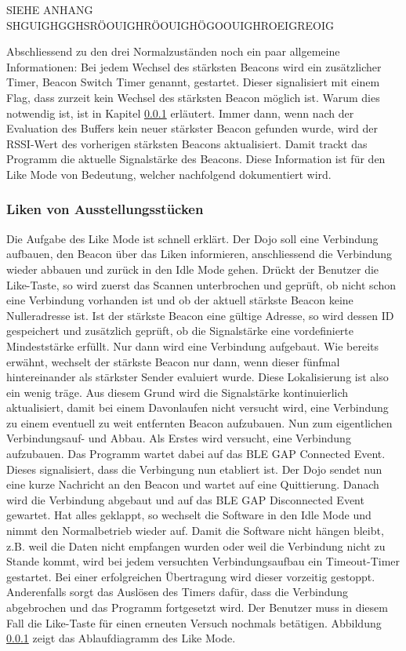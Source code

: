 SIEHE ANHANG SHGUIGHGGHSRÖOUIGHRÖOUIGHÖGOOUIGHROEIGREOIG

 
 
 
Abschliessend zu den drei Normalzuständen noch ein paar allgemeine Informationen: Bei jedem Wechsel des stärksten Beacons wird ein zusätzlicher Timer, Beacon Switch Timer genannt, gestartet. Dieser signalisiert mit einem Flag, dass zurzeit kein Wechsel des stärksten Beacon möglich ist. Warum dies notwendig ist, ist in Kapitel \ref{} erläutert. Immer dann, wenn nach der Evaluation des Buffers kein neuer stärkster Beacon gefunden wurde, wird der RSSI-Wert des vorherigen stärksten Beacons aktualisiert. Damit trackt das Programm die aktuelle Signalstärke des Beacons. Diese Information ist für den Like Mode von Bedeutung, welcher nachfolgend dokumentiert wird.
\subsubsection{Liken von Ausstellungsstücken}
Die Aufgabe des Like Mode ist schnell erklärt. Der Dojo soll eine Verbindung aufbauen, den Beacon über das Liken informieren, anschliessend die Verbindung wieder abbauen und zurück in den Idle Mode gehen.
Drückt der Benutzer die Like-Taste, so wird zuerst das Scannen unterbrochen und geprüft, ob nicht schon eine Verbindung vorhanden ist und ob der aktuell stärkste Beacon keine Nulleradresse ist. Ist der stärkste Beacon eine gültige Adresse, so wird dessen ID gespeichert und zusätzlich geprüft, ob die Signalstärke eine vordefinierte Mindeststärke erfüllt. Nur dann wird eine Verbindung aufgebaut. Wie bereits erwähnt, wechselt der stärkste Beacon nur dann, wenn dieser fünfmal hintereinander als stärkster Sender evaluiert wurde. Diese Lokalisierung ist also ein wenig träge. Aus diesem Grund wird die Signalstärke kontinuierlich aktualisiert, damit bei einem Davonlaufen nicht versucht wird, eine Verbindung zu einem eventuell zu weit entfernten Beacon aufzubauen.
Nun zum eigentlichen Verbindungsauf- und Abbau. Als Erstes wird versucht, eine Verbindung aufzubauen. Das Programm wartet dabei auf das BLE GAP Connected Event. Dieses signalisiert, dass die Verbingung nun etabliert ist. Der Dojo sendet nun eine kurze Nachricht an den Beacon und wartet auf eine Quittierung. Danach wird die Verbindung abgebaut und auf das BLE GAP Disconnected Event gewartet. Hat alles geklappt, so wechselt die Software in den Idle Mode und nimmt den Normalbetrieb wieder auf. Damit die Software nicht hängen bleibt, z.B. weil die Daten nicht empfangen wurden oder weil die Verbindung nicht zu Stande kommt, wird bei jedem versuchten Verbindungsaufbau ein Timeout-Timer gestartet. Bei einer erfolgreichen Übertragung wird dieser vorzeitig gestoppt. Anderenfalls sorgt das Auslösen des Timers dafür, dass die Verbindung abgebrochen und das Programm fortgesetzt wird. Der Benutzer muss in diesem Fall die Like-Taste für einen erneuten Versuch nochmals betätigen. Abbildung \ref{} zeigt das Ablaufdiagramm des Like Mode.
